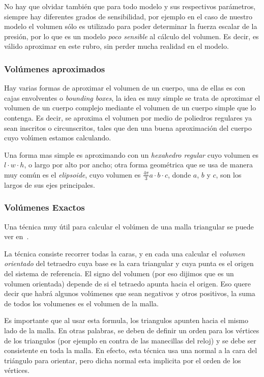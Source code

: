 No hay que olvidar también que para todo modelo y sus respectivos parámetros, siempre hay diferentes grados de sensibilidad, por ejemplo en el caso de nuestro modelo el volumen sólo es utilizado para poder determinar la fuerza escalar de la presión, por lo que es un modelo \emph{poco sensible} al cálculo del volumen.
Es decir, es válido aproximar en este rubro, sin perder mucha realidad en el modelo.

\subsubsection{Volúmenes aproximados}
Hay varias formas de aproximar el volumen de un cuerpo, una de ellas es con cajas envolventes o \emph{\foreignlanguage{english}{bounding boxes}}, la idea es muy simple se trata de aproximar el volumen de un cuerpo complejo mediante el volumen de un cuerpo simple que lo contenga.
Es decir, se aproxima el volumen por medio de poliedros regulares ya sean inscritos o circunscritos, tales que den una buena aproximación del cuerpo cuyo volúmen estamos calculando.

Una forma mas simple es aproximando con un \emph{hexahedro regular} cuyo volumen es $ l \cdot w \cdot h $, o largo por alto por ancho; otra forma geométrica que se usa de manera muy común es el \emph{elipsoide}, cuyo volumen es $ \frac{4\pi}{3} a \cdot   b \cdot  c $, donde $a$, $b$ y $c$, son los largos de sus ejes principales.
\subsubsection{Volúmenes Exactos}
Una técnica muy útil para calcular el volúmen de una malla triangular se puede ver en~\cite{Zhang:volumen}.

La técnica consiste recorrer todas la caras, y en cada una calcular el \emph{volumen orientado} del tetraedro cuya base es la cara triangular y cuya punta es el origen del sistema de referencia.
El signo del volumen (por eso dijimos que es un volumen orientada) depende de si el tetraedo apunta hacia el origen.
Eso quere decir que habrá algunos volúmenes que sean negativos y otros positivos, la suma de todos los volumenes es el volumen de la malla.

Es importante que al usar esta formula, los triangulos apunten hacia el mismo lado de la malla.
En otras palabras, se deben de definir un orden para los vértices de los triangulos (por ejemplo en contra de las manecillas del reloj) y se debe ser consistente en toda la malla.
En efecto, esta técnica usa una normal a la cara del triángulo para orientar, pero dicha normal esta implicita por el orden de los vértices.

